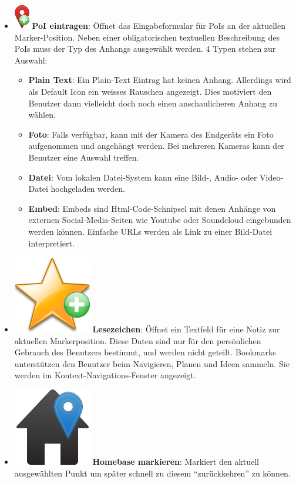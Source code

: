 \begin{itemize}[leftmargin=*,noitemsep,topsep=1ex,parsep=0pt,partopsep=0pt]
\item \includegraphics[scale=0.55]{bilder/icons/add-marker.png} \textbf{PoI eintragen}: Öffnet das Eingabeformular für PoIs an der aktuellen Marker-Position. Neben einer obligatorischen textuellen Beschreibung des PoIs muss der Typ des Anhangs ausgewählt werden. 4 Typen stehen zur Auswahl:
	\begin{itemize}[leftmargin=*,noitemsep,topsep=1ex,parsep=0pt,partopsep=0pt]
		\item \textbf{Plain Text}: Ein Plain-Text Eintrag hat keinen Anhang. Allerdings wird als Default Icon ein weisses Rauschen angezeigt. Dies motiviert den Benutzer dann vielleicht doch noch einen anschaulicheren Anhang zu wählen.
		\item \textbf{Foto}: Falls verfügbar, kann mit der Kamera des Endgeräts ein Foto aufgenommen und angehängt werden. Bei mehreren Kameras kann der Benutzer eine Auswahl treffen.
		\item \textbf{Datei}: Vom lokalen Datei-System kann eine Bild-, Audio- oder Video-Datei hochgeladen werden.
		\item \textbf{Embed}: Embeds sind Html-Code-Schnipsel mit denen Anhänge von externen Social-Media-Seiten wie Youtube oder Soundcloud eingebunden werden können. Einfache URLs werden als Link zu einer Bild-Datei interpretiert.
	\end{itemize}
\item \includegraphics[scale=0.15]{bilder/icons/add-bookmark.png} \textbf{Lesezeichen}: Öffnet ein Textfeld für eine Notiz zur aktuellen Markerposition. Diese Daten sind nur für den persönlichen Gebrauch des Benutzers bestimmt, und werden nicht geteilt. Bookmarks unterstützen den Benutzer beim Navigieren, Planen und Ideen sammeln.
Sie werden im Kontext-Navigations-Fenster angezeigt.
\item \includegraphics[scale=0.15]{bilder/icons/set-home.png} \textbf{Homebase markieren}: Markiert den aktuell ausgewählten Punkt um später schnell zu diesem "`zurückkehren"' zu können.

\end{itemize}
